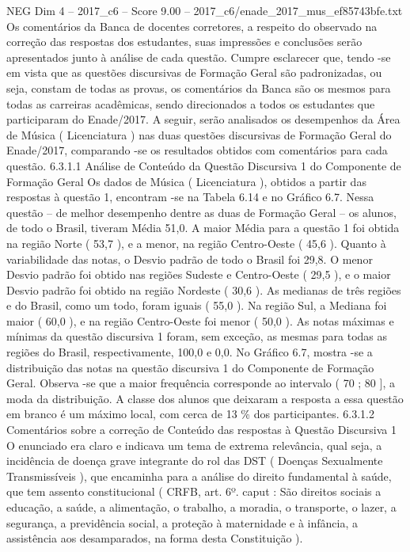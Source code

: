 \begin{textsample}{NEG Dim 4 – 2017\_c6 – Score 9.00 – 2017\_c6/enade\_2017\_mus\_ef85743bfe.txt}
Os comentários da Banca de docentes corretores, a respeito do observado na correção das respostas dos estudantes, suas impressões e conclusões serão apresentados junto à análise de cada questão.
Cumpre esclarecer que, tendo -se em vista que as questões discursivas de Formação Geral são padronizadas, ou seja, constam de todas as provas, os comentários da Banca são os mesmos para todas as carreiras acadêmicas, sendo direcionados a todos os estudantes que participaram do Enade/2017.
A seguir, serão analisados os desempenhos da Área de Música ( Licenciatura ) nas duas questões discursivas de Formação Geral do Enade/2017, comparando -se os resultados obtidos com comentários para cada questão. 6.3.1.1 Análise de Conteúdo da Questão Discursiva 1 do Componente de Formação Geral Os dados de Música ( Licenciatura ), obtidos a partir das respostas à questão 1, encontram -se na Tabela 6.14 e no Gráfico 6.7.
Nessa questão – de melhor desempenho dentre as duas de Formação Geral – os alunos, de todo o Brasil, tiveram Média 51,0.
A maior Média para a questão 1 foi obtida na região Norte ( 53,7 ), e a menor, na região Centro-Oeste ( 45,6 ).
Quanto à variabilidade das notas, o Desvio padrão de todo o Brasil foi 29,8.
O menor Desvio padrão foi obtido nas regiões Sudeste e Centro-Oeste ( 29,5 ), e o maior Desvio padrão foi obtido na região Nordeste ( 30,6 ).
As medianas de três regiões e do Brasil, como um todo, foram iguais ( 55,0 ).
Na região Sul, a Mediana foi maior ( 60,0 ), e na região Centro-Oeste foi menor ( 50,0 ).
As notas máximas e mínimas da questão discursiva 1 foram, sem exceção, as mesmas para todas as regiões do Brasil, respectivamente, 100,0 e 0,0.
No Gráfico 6.7, mostra -se a distribuição das notas na questão discursiva 1 do Componente de Formação Geral.
Observa -se que a maior frequência corresponde ao intervalo ( 70 ; 80 ], a moda da distribuição.
A classe dos alunos que deixaram a resposta a essa questão em branco é um máximo local, com cerca de 13 \% dos participantes. 6.3.1.2 Comentários sobre a correção de Conteúdo das respostas à Questão Discursiva 1 O enunciado era claro e indicava um tema de extrema relevância, qual seja, a incidência de doença grave integrante do rol das DST ( Doenças Sexualmente Transmissíveis ), que encaminha para a análise do direito fundamental à saúde, que tem assento constitucional ( CRFB, art. 6º. caput : São direitos sociais a educação, a saúde, a alimentação, o trabalho, a moradia, o transporte, o lazer, a segurança, a previdência social, a proteção à maternidade e à infância, a assistência aos desamparados, na forma desta Constituição ).

\end{textsample}
